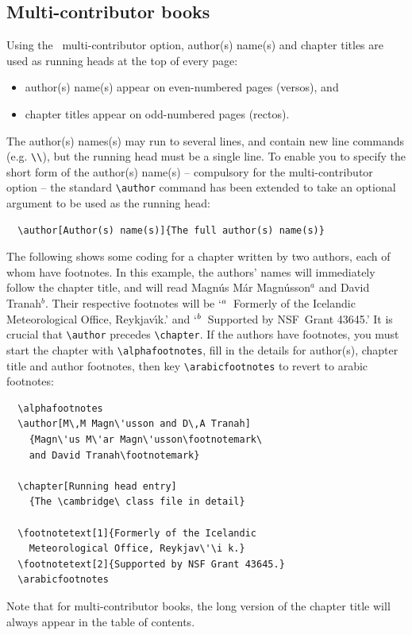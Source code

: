 \subsection{Multi-contributor books}
\label{multicontributor}

Using the \cambridge\ multi-contributor option, author(s) name(s) and chapter titles are used as running heads at the top of every page:
\begin{itemize}
\item author(s) name(s) appear on even-numbered pages (versos), and
\item chapter titles appear on odd-numbered pages (rectos).
\end{itemize}
The author(s) names(s) may run to several lines, and contain new line commands (e.g. \verb"\\"), but the running head must be a single line. To enable you to specify the short form of the author(s) name(s) -- compulsory for the multi-contributor option -- the standard \verb"\author" command has been extended to take an optional argument to be used as the running head:
\begin{verbatim}
  \author[Author(s) name(s)]{The full author(s) name(s)}
\end{verbatim}
The following shows some coding for a chapter written by two authors, each of whom have footnotes. In this example, the authors' names will immediately follow the chapter title, and will read Magn\'us M\'ar Magn\'usson$^{a}$ and David Tranah$^{b}$. Their respective footnotes will be `$^{a}\enskip$Formerly of the Icelandic Meteorological Office, Reykjav\'\i k.' and `$^{b}\enskip$Supported by NSF~Grant 43645.' It is crucial that \verb"\author" precedes \verb"\chapter". If the authors have footnotes, you must start the chapter with \verb"\alphafootnotes", fill in the details for author(s), chapter title and author footnotes, then key \verb"\arabicfootnotes" to revert to arabic footnotes:
\begin{verbatim}
  \alphafootnotes
  \author[M\,M Magn\'usson and D\,A Tranah]
    {Magn\'us M\'ar Magn\'usson\footnotemark\
    and David Tranah\footnotemark}

  \chapter[Running head entry]
    {The \cambridge\ class file in detail}

  \footnotetext[1]{Formerly of the Icelandic
    Meteorological Office, Reykjav\'\i k.}
  \footnotetext[2]{Supported by NSF Grant 43645.}
  \arabicfootnotes
\end{verbatim}
Note that for multi-contributor books, the long version of the chapter title will always appear in the table of contents.

